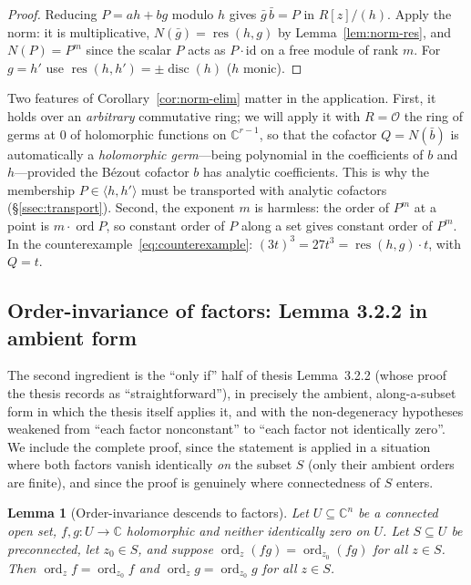 \documentclass[11pt,a4paper]{article}
\theoremstyle{plain}
\newtheorem{lemma}[theorem]{Lemma}
\theoremstyle{definition}
\newcommand{\C}{\mathbb{C}}
\DeclareMathOperator{\ord}{ord}
\DeclareMathOperator{\res}{res}
\DeclareMathOperator{\disc}{disc}
\newcommand{\ideal}[1]{\langle #1\rangle}
\newcommand{\OO}{\mathcal{O}}
\begin{document}
\begin{proof}
Reducing $P=ah+bg$ modulo $h$ gives $\bar g\,\bar b=P$ in $R[z]/(h)$. Apply
the norm: it is multiplicative, $N(\bar g)=\res(h,g)$ by
Lemma~\ref{lem:norm-res}, and $N(P)=P^m$ since the scalar $P$ acts as
$P\cdot\mathrm{id}$ on a free module of rank $m$. For $g=h'$ use
$\res(h,h')=\pm\disc(h)$ ($h$ monic).
\end{proof}

Two features of Corollary~\ref{cor:norm-elim} matter in the application.
First, it holds over an \emph{arbitrary} commutative ring; we will apply it
with $R=\OO$ the ring of germs at $0$ of holomorphic functions on
$\C^{r-1}$, so that the cofactor $Q=N(\bar b)$ is automatically a
\emph{holomorphic germ}---being polynomial in the coefficients of $b$ and
$h$---provided the B\'ezout cofactor $b$ has analytic coefficients. This is
why the membership $P\in\ideal{h,h'}$ must be transported with analytic
cofactors (\S\ref{ssec:transport}). Second, the exponent $m$ is harmless: the
order of $P^m$ at a point is $m\cdot\ord P$, so constant order of $P$ along a
set gives constant order of $P^m$.
In the counterexample~\eqref{eq:counterexample}:
$(3t)^3=27t^3=\res(h,g)\cdot t$, with $Q=t$.

\subsection{Order-invariance of factors: Lemma 3.2.2 in ambient form}
\label{ssec:order-add}

The second ingredient is the ``only if'' half of thesis Lemma~3.2.2 (whose
proof the thesis records as ``straightforward''), in precisely the ambient,
along-a-subset form in which the thesis itself applies it, and with the
non-degeneracy hypotheses weakened from ``each factor nonconstant'' to ``each
factor not identically zero''. We include the complete proof, since the
statement is applied in a situation where both factors vanish identically
\emph{on} the subset $S$ (only their ambient orders are finite), and since the
proof is genuinely where connectedness of $S$ enters.

\begin{lemma}[Order-invariance descends to factors]\label{lem:order-add}
Let $U\subseteq\C^n$ be a connected open set, $f,g:U\to\C$ holomorphic and
neither identically zero on $U$. Let $S\subseteq U$ be preconnected, let
$z_0\in S$, and suppose $\ord_z(fg)=\ord_{z_0}(fg)$ for all $z\in S$. Then
$\ord_z f=\ord_{z_0}f$ and $\ord_z g=\ord_{z_0}g$ for all $z\in S$.
\end{lemma}
\end{document}
